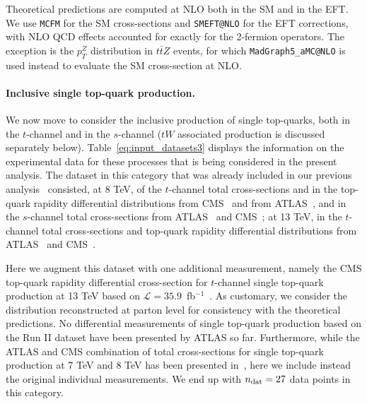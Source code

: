 Theoretical predictions are computed at NLO both in the SM and in the EFT.
%
We use {\tt MCFM} for the SM cross-sections and {\tt SMEFT@NLO} for the EFT corrections,
with NLO QCD effects accounted for exactly for the 2-fermion operators. 
%
The exception is the $p_T^Z$ distribution in $t\bar{t}Z$ events, for which
{\tt MadGraph5\_aMC@NLO} is used instead to evaluate the SM cross-section
at NLO.

\paragraph{Inclusive single top-quark production.}
We now move to consider the inclusive production of single top-quarks,
both in the $t$-channel and in the $s$-channel ($tW$ associated production is
discussed separately below).
%
Table~\ref{eq:input_datasets3} displays the information on
the experimental data for these processes that is being considered in the
present analysis.
%
The dataset in this category that was already included in our
previous analysis~\cite{Hartland:2019bjb} consisted, at 8 TeV, of the
$t$-channel total cross-sections and in the top-quark rapidity differential
distributions from CMS~\cite{Khachatryan:2014iya,CMS-PAS-TOP-14-004}
and from ATLAS~\cite{Aaboud:2017pdi}, and in the $s$-channel total
cross-sections from ATLAS~\cite{Aad:2015upn} and CMS~\cite{Khachatryan:2016ewo};
at 13 TeV, in  the $t$-channel total cross-sections and top-quark rapidity
differential distributions from ATLAS~\cite{Aaboud:2016ymp} and
CMS~\cite{CMS:2016xnv,Sirunyan:2016cdg}.

Here we augment this dataset with one additional measurement, namely the CMS
top-quark rapidity differential cross-section for $t$-channel single top-quark
production at 13 TeV based on
$\mathcal{L}=35.9$~fb$^{-1}$~\cite{Sirunyan:2019hqb}.
%
As customary, we consider the distribution reconstructed at parton level for
consistency with the theoretical predictions.
No differential measurements of single top-quark production
based on the Run II dataset have been presented by ATLAS so far.
Furthermore, while the ATLAS and CMS combination of total cross-sections for
single top-quark production at 7 TeV and 8 TeV has been presented
in~\cite{Aaboud:2019pkc}, here we include instead the original individual
measurements. We end up with $n_{\rm dat}=27$ data points in this category.



